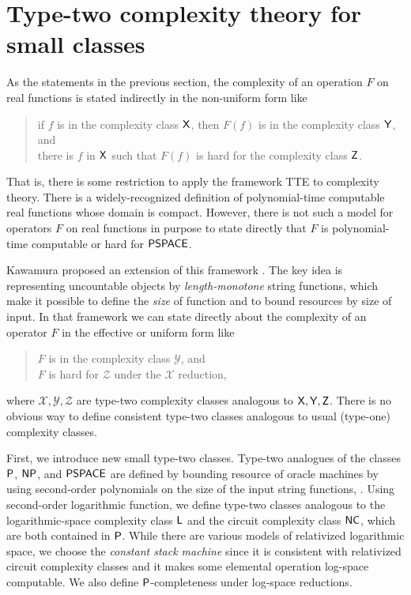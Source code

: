 \section{Type-two complexity theory for small classes}
As the statements in the previous section,
the complexity of an operation $F$ on real functions
is stated indirectly in the non-uniform form like
\begin{quote}
 if $f$ is in the complexity class $\mathsf{X}$,
 then $F(f)$ is in the complexity class $\mathsf{Y}$, and \\
 there is $f$ in $\mathsf{X}$ such that $F(f)$ is hard for
 the complexity class $\mathsf{Z}$.
\end{quote}
That is, there is some restriction to apply the framework TTE
to complexity theory.
There is a widely-recognized definition of polynomial-time computable 
real functions whose domain is compact.
However, there is not such a model for
operators $F$ on real functions in purpose to state
directly that $F$ is polynomial-time computable or hard for $\mathsf{PSPACE}$.

Kawamura proposed an extension of this framework \cite{kawamura2012complexity}.
The key idea is representing uncountable 
objects by \emph{length-monotone} string functions, which make it possible to define the
\emph{size} of function and to bound resources by size of input.
In that framework we can state directly about the complexity of
 an operator $F$ in the effective or uniform form like
\begin{quote}
 $F$ is in the complexity class $\mathcal Y$, and \\
 $F$ is hard for $\mathcal Z$ under the $\mathcal X$ reduction,
\end{quote}
where $\mathcal{X, Y, Z}$ are type-two complexity classes analogous to $\mathsf{X, Y, Z}$.
There is no obvious way to define consistent type-two classes 
analogous to usual (type-one) complexity classes.

First, we introduce new small type-two classes.
Type-two analogues of the classes $\mathsf{P}$, $\mathsf{NP}$, and $\mathsf{PSPACE}$
are defined by bounding resource of oracle machines by using 
second-order polynomials on the size of the input string functions,
\cite{kawamura2012complexity}.
Using second-order logarithmic function,
we define type-two classes analogous to the logarithmic-space 
complexity class $\mathsf{L}$ and the circuit complexity class $\mathsf{NC}$, 
which are both contained in $\mathsf{P}$.
While there are various models of relativized logarithmic space,
we choose the \emph{constant stack machine} \cite{aehlig2007relativizing} 
since it is consistent with relativized circuit complexity classes 
and it makes some elemental operation log-space computable.
We also define $\mathsf{P}$-completeness under log-space reductions.

